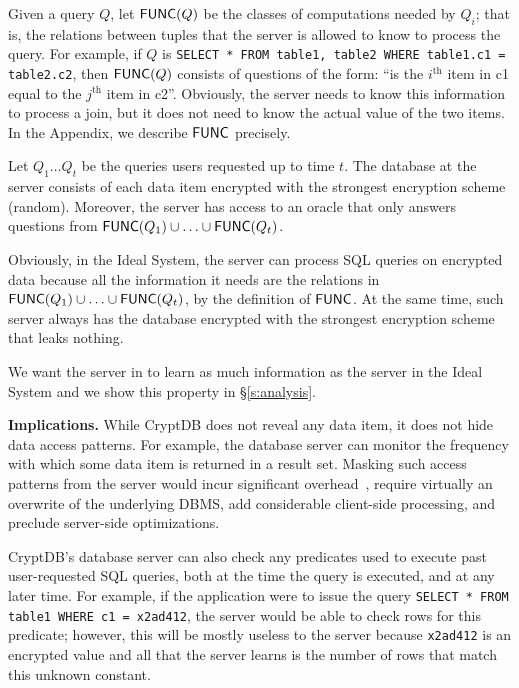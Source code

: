 Given a query $Q$, let $\mathsf{FUNC}(Q)$ be the classes of computations needed by
$Q_i$; that is, the relations between tuples that the server is allowed
to know to process
the query. For example, if $Q$ is \texttt{SELECT * FROM table1, table2 WHERE
table1.c1 = table2.c2}, then $\mathsf{FUNC}(Q)$ consists of questions of the form: ``is
the $i^\mathrm{th}$ item in c1 equal to the $j^\mathrm{th}$ item in c2''.
Obviously, the server
needs to know this information to process a join, but it does not need to know
the actual value of the two items. In the Appendix, we describe $\mathsf{FUNC}$ precisely.

\begin{definition}\label{def:sec}
Let $Q_1 \ldots Q_t$ be the queries users requested up to time $t$. The
database at the server consists of each data item encrypted with the strongest
encryption scheme (random). Moreover, the
server has access to an oracle that only answers questions from $\mathsf{FUNC}(Q_1) \cup \ldots \cup \mathsf{FUNC}(Q_t)$.
\end{definition}

Obviously, in the Ideal System, the server can process SQL queries on encrypted
data because all the information it needs are the relations in $\mathsf{FUNC}(Q_1)
\cup \ldots \cup \mathsf{FUNC}(Q_t)$, by the definition of $\mathsf{FUNC}$. At the same time, such
server always has the database encrypted with the strongest encryption scheme
that leaks nothing.

We want the server in \name{} to learn as much information as the server in the
Ideal System and we show this property in \S\ref{s:analysis}.

\textbf{Implications.} While CryptDB does not reveal any data item, it does not
hide data access patterns.  For example, the database server can
monitor the frequency with which some data item is returned in a result set.
Masking such access patterns from the server would incur significant
overhead~\cite{pir-survey}, require virtually an
overwrite of the underlying DBMS, add considerable client-side
processing, and preclude server-side optimizations. 

CryptDB's database server can also check any predicates used to
execute past user-requested SQL queries, both at the time the query is executed,
and at any later time.  For example, if the application were to
issue the query {\tt SELECT * FROM table1 WHERE c1 = x2ad412}, the server
would be able to check rows for this predicate; however, this will be mostly
useless to the server because \texttt{x2ad412} is an
encrypted value and all that the server learns is the number of rows that match
this unknown constant.

